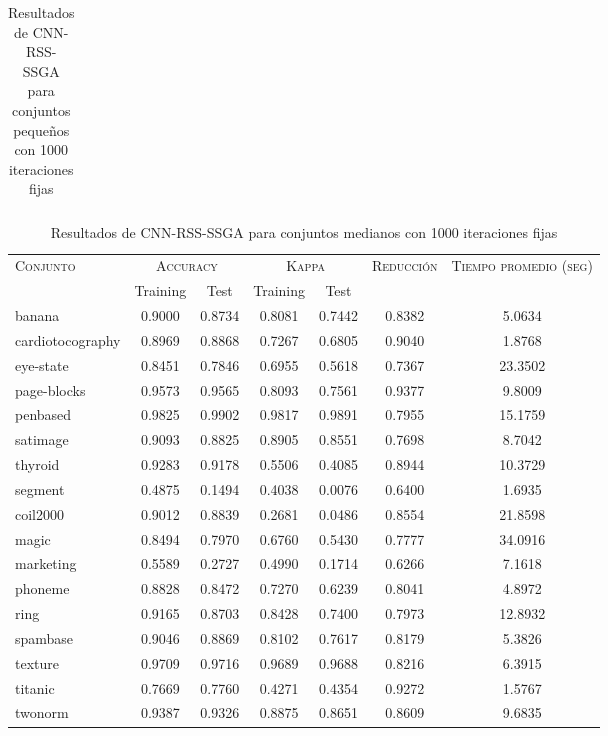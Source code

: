 \begin{table}[]
\begin{tabular}{l c c c c c c}
\hline
\end{tabular}
\caption{Resultados de CNN-RSS-SSGA para conjuntos pequeños con 1000 iteraciones fijas}
\label{res-peq-CNN-RSS-ssga}
\end{table}


\begin{table}[]
\centering
\begin{tabular}{l c c c c c c}
\hline
\multirow{2}{*}{\textsc{Conjunto}}
	& \multicolumn{2}{c}{\textsc{Accuracy}}
	& \multicolumn{2}{c}{\textsc{Kappa}}
	& \textsc{Reducción}
	& \textsc{Tiempo promedio (seg)} \\
	& Training & Test
	& Training & Test \\ 
\hline
\hline

banana & 0.9000 & 0.8734 & 0.8081 & 0.7442 & 0.8382 & 5.0634 \\
cardiotocography & 0.8969 & 0.8868 & 0.7267 & 0.6805 & 0.9040 & 1.8768 \\
eye-state & 0.8451 & 0.7846 & 0.6955 & 0.5618 & 0.7367 &  23.3502 \\
page-blocks & 0.9573 & 0.9565 & 0.8093 & 0.7561 & 0.9377 & 9.8009 \\
penbased & 0.9825 & 0.9902 & 0.9817 & 0.9891 & 0.7955 & 15.1759 \\
satimage & 0.9093 & 0.8825 & 0.8905 & 0.8551 & 0.7698 & 8.7042 \\
thyroid & 0.9283 & 0.9178 & 0.5506 & 0.4085 & 0.8944 & 10.3729 \\
segment & 0.4875 & 0.1494 & 0.4038 & 0.0076 & 0.6400 & 1.6935 \\
coil2000 & 0.9012 & 0.8839 & 0.2681 & 0.0486 & 0.8554 &  21.8598 \\
magic & 0.8494 & 0.7970 & 0.6760 & 0.5430 & 0.7777 &  34.0916 \\
marketing & 0.5589 & 0.2727 & 0.4990 & 0.1714 & 0.6266 & 7.1618 \\
phoneme & 0.8828 & 0.8472 & 0.7270 & 0.6239 & 0.8041 & 4.8972 \\
ring & 0.9165 & 0.8703 & 0.8428 & 0.7400 & 0.7973 & 12.8932 \\
spambase & 0.9046 & 0.8869 & 0.8102 & 0.7617 & 0.8179 & 5.3826 \\
texture & 0.9709 & 0.9716 & 0.9689 & 0.9688 & 0.8216 & 6.3915 \\
titanic & 0.7669 & 0.7760 & 0.4271 & 0.4354 & 0.9272 & 1.5767 \\
twonorm & 0.9387 & 0.9326 & 0.8875 & 0.8651 & 0.8609 & 9.6835 \\

\hline
\end{tabular}
\caption{Resultados de CNN-RSS-SSGA para conjuntos medianos con 1000 iteraciones fijas}
\label{res-med-CNN-RSS-ssga}
\end{table}


